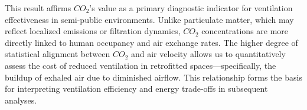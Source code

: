 \documentclass[preprint,12pt]{elsarticle}
\begin{document}
This result affirms $CO_2$’s value as a primary diagnostic indicator for ventilation effectiveness in semi-public environments. Unlike particulate matter, which may reflect localized emissions or filtration dynamics, $CO_2$ concentrations are more directly linked to human occupancy and air exchange rates. The higher degree of statistical alignment between $CO_2$ and air velocity allows us to quantitatively assess the cost of reduced ventilation in retrofitted spaces—specifically, the buildup of exhaled air due to diminished airflow. This relationship forms the basis for interpreting ventilation efficiency and energy trade-offs in subsequent analyses.


\end{document}

